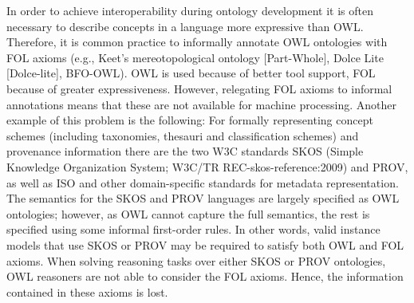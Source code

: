 \documentclass[10pt,fleqn,final]{scrreprt}
\newcommand{\nisref}[1]{#1}
\newenvironment{definitions}[0]{\medskip }{}
\begin{document}
\begin{definitions}
In order to achieve interoperability during ontology development it is often necessary to describe 
concepts in a language more expressive than OWL.  Therefore, it is common practice to informally 
annotate OWL ontologies with FOL axioms (e.g., Keet's mereotopological ontology [Part-Whole], 
Dolce Lite [Dolce-lite], BFO-OWL). OWL is used because of better tool support, FOL because of 
greater expressiveness. However, relegating FOL axioms to  informal annotations means that these 
are not available for machine processing.  Another example of this problem is the following: For 
formally representing concept schemes (including taxonomies, thesauri and classification schemes) 
and provenance information there are the two W3C standards SKOS (Simple Knowledge Organization 
System; \nisref{W3C/TR REC-skos-reference:2009}) and PROV, as well as ISO and other domain-specific  standards for 
metadata representation. The semantics for the SKOS and PROV languages are largely specified as OWL 
ontologies; however, as OWL cannot capture the full semantics, the rest is specified using some 
informal first-order rules. In other words, valid instance models that use SKOS or PROV may be 
required to satisfy both OWL and FOL axioms. When solving reasoning tasks over either SKOS or PROV 
ontologies, OWL reasoners are not able to consider the  FOL axioms. Hence, the information 
contained in these axioms is lost.


\end{definitions}
\end{document}
